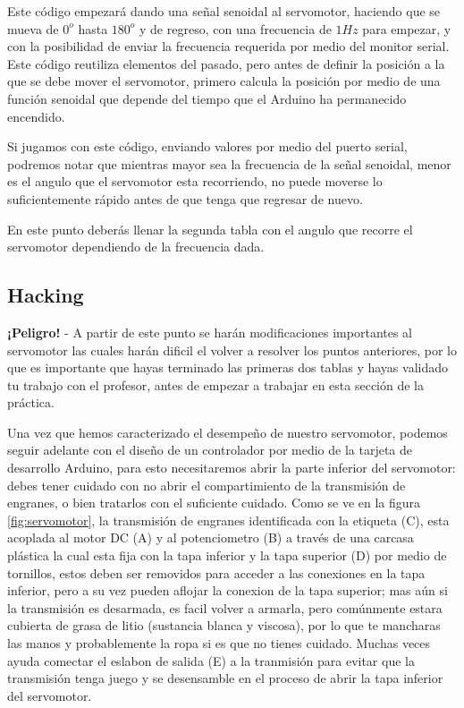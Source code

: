 		Este código empezará dando una señal senoidal al servomotor, haciendo que se mueva de $0^o$ hasta $180^o$ y de regreso, con una frecuencia de $1Hz$ para empezar, y con la posibilidad de enviar la frecuencia requerida por medio del monitor serial. Este código reutiliza elementos del pasado, pero antes de definir la posición a la que se debe mover el servomotor, primero calcula la posición por medio de una función senoidal que depende del tiempo que el Arduino ha permanecido encendido.

		Si jugamos con este código, enviando valores por medio del puerto serial, podremos notar que mientras mayor sea la frecuencia de la señal senoidal, menor es el angulo que el servomotor esta recorriendo, no puede moverse lo suficientemente rápido antes de que tenga que regresar de nuevo.

		En este punto deberás llenar la segunda tabla con el angulo que recorre el servomotor dependiendo de la frecuencia dada.

		\subsection{Hacking}

		\textbf{¡Peligro!} - A partir de este punto se harán modificaciones importantes al servomotor las cuales harán dificil el volver a resolver los puntos anteriores, por lo que es importante que hayas terminado las primeras dos tablas y hayas validado tu trabajo con el profesor, antes de empezar a trabajar en esta sección de la práctica.

		Una vez que hemos caracterizado el desempeño de nuestro servomotor, podemos seguir adelante con el diseño de un controlador por medio de la tarjeta de desarrollo Arduino, para esto necesitaremos abrir la parte inferior del servomotor: debes tener cuidado con no abrir el compartimiento de la transmisión de engranes, o bien tratarlos con el suficiente cuidado. Como se ve en la figura \ref{fig:servomotor}, la transmisión de engranes identificada con la etiqueta (C), esta acoplada al motor DC (A) y al potenciometro (B) a través de una carcasa plástica la cual esta fija con la tapa inferior y la tapa superior (D) por medio de tornillos, estos deben ser removidos para acceder a las conexiones en la tapa inferior, pero a su vez pueden aflojar la conexion de la tapa superior; mas aún si la transmisión es desarmada, es facil volver a armarla, pero comúnmente estara cubierta de grasa de litio (sustancia blanca y viscosa), por lo que te mancharas las manos y probablemente la ropa si es que no tienes cuidado. Muchas veces ayuda comectar el eslabon de salida (E) a la tranmisión para evitar que la transmisión tenga juego y se desensamble en el proceso de abrir la tapa inferior del servomotor.

